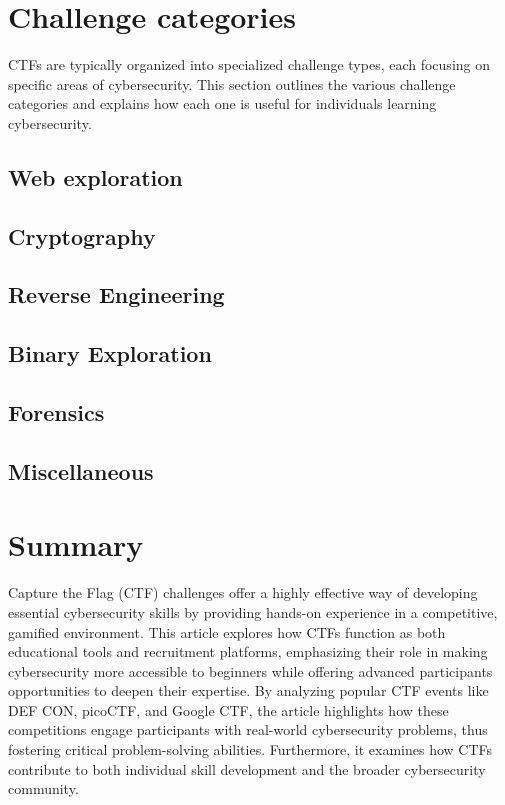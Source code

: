 \documentclass[conference]{IEEEtran}
\begin{document}
\section{Challenge categories}

CTFs are typically organized into specialized challenge types, each focusing on
specific areas of cybersecurity. This section outlines the various challenge
categories and explains how each one is useful for individuals learning
cybersecurity.

\subsection{Web exploration}

\subsection{Cryptography}

\subsection{Reverse Engineering}

\subsection{Binary Exploration}

\subsection{Forensics}

\subsection{Miscellaneous}

\section{Summary}

Capture the Flag (CTF) challenges offer a highly effective way of developing
essential cybersecurity skills by providing hands-on experience in a
competitive, gamified environment. This article explores how CTFs function as
both educational tools and recruitment platforms, emphasizing their role in
making cybersecurity more accessible to beginners while offering advanced
participants opportunities to deepen their expertise. By analyzing popular CTF
events like DEF CON, picoCTF, and Google CTF, the article highlights how these
competitions engage participants with real-world cybersecurity problems, thus
fostering critical problem-solving abilities. Furthermore, it examines how CTFs
contribute to both individual skill development and the broader cybersecurity
community.



\end{document}

